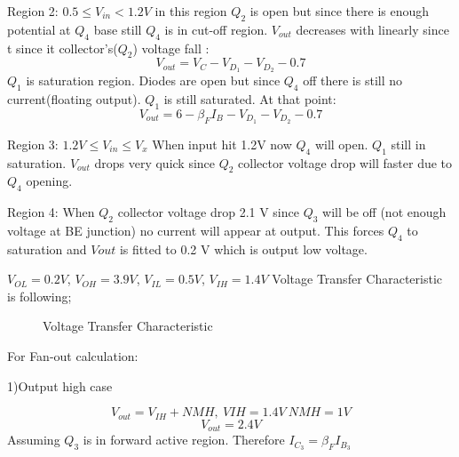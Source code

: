 \documentclass[11 pt]{article}
\begin{document}
Region 2: $0.5 \leq V_{in} < 1.2V$ in this region $Q_2$ is open but since there is enough potential at $Q_4$ base still $Q_4$ is in cut-off region. $V_{out}$ decreases with linearly since t since it collector's($Q_2$) voltage fall :
$$V_{out}=V_C-V_{D_1}-V_{D_2}-0.7$$ $Q_1$ is saturation region. Diodes are open but since $Q_4$ off there is still no current(floating output). $Q_1$ is still saturated. At that point:
$$V_{out}=6-\beta_F I_B-V_{D_1}-V_{D_2}-0.7$$

Region 3: $1.2V \leq V_{in} \leq V_x$ When input hit 1.2V now $Q_4$ will open. $Q_1$ still in saturation. $V_{out}$ drops very quick since $Q_2$ collector voltage drop will faster due to $Q_4$ opening.

Region 4: When $Q_2$ collector voltage drop 2.1 V since $Q_3$ will be off (not enough voltage at BE junction) no current will appear at output. This forces $Q_4$ to saturation and $V{out}$ is fitted to 0.2 V which is output low voltage. 


$V_{OL}=0.2V$, $V_{OH}=3.9V$, $V_{IL}=0.5V$, $V_{IH}=1.4V$
Voltage Transfer Characteristic is following;
\begin{figure}[H]
\centering
{}
\caption{Voltage Transfer Characteristic}
\end{figure}

For Fan-out calculation:

1)Output high case

$$V_{out}=V_{IH}+NMH,\> V{IH}=1.4V \> NMH=1V$$
$$V_{out}=2.4V$$
Assuming $Q_3$ is in forward active region. Therefore $I_{C_3}=\beta_F I_{B_3}$
\end{document}
